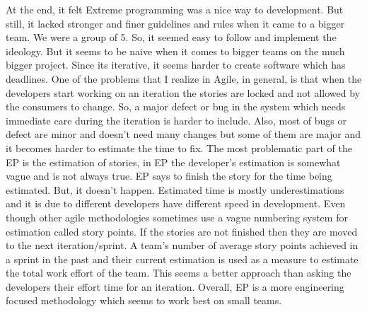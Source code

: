 At the end, it felt Extreme programming was a nice way to development. But still, it lacked stronger and finer guidelines and rules when it came to a bigger team. We were a group of 5. So, it seemed easy to follow and implement the ideology. But it seems to be naive when it comes to bigger teams on the much bigger project. Since its iterative, it seems harder to create software which has deadlines. One of the problems that I realize in Agile, in general, is that when the developers start working on an iteration the stories are locked and not allowed by the consumers to change. So, a major defect or bug in the system which needs immediate care during the iteration is harder to include. Also, most of bugs or defect are minor and doesn't need many changes but some of them are major and it becomes harder to estimate the time to fix. The most problematic part of the EP is the estimation of stories, in EP the developer’s estimation is somewhat vague and is not always true. EP says to finish the story for the time being estimated. But, it doesn't happen. Estimated time is mostly underestimations and it is due to different developers have different speed in development. Even though other agile methodologies sometimes use a vague numbering system for estimation called story points. If the stories are not finished then they are moved to the next iteration/sprint. A team's number of average story points achieved in a sprint in the past and their current estimation is used as a measure to estimate the total work effort of the team. This seems a better approach than asking the developers their effort time for an iteration. Overall, EP is a more engineering focused methodology which seems to work best on small teams.
